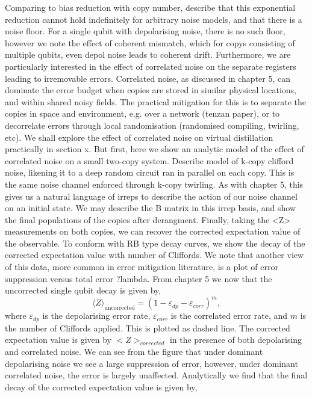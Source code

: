 Comparing to bias reduction with copy number, describe that this exponential reduction cannot hold indefinitely for arbitrary noise models, and that there is a noise floor. For a single qubit with depolarising noise, there is no such floor, however we note the effect of coherent mismatch, which for copys consisting of multiple qubits, even depol noise leads to coherent drift.
Furthermore, we are particularly interested in the effect of correlated noise on the separate registers leading to irremovable errors. Correlated noise, as discussed in chapter 5, can dominate the error budget when copies are stored in similar physical locations, and within shared noisy fields. The practical mitigation for this is to separate the copies in space and environment, e.g. over a network (tenzan paper), or to decorrelate errors through local randomisation (randomised compiling, twirling, etc). We shall explore the effect of correlated noise on virtual distillation practically in section x. But first, here we show an analytic model of the effect of correlated noise on a small two-copy system.
Describe model of k-copy clifford noise, likening it to a deep random circuit ran in parallel on each copy. This is the same noise channel enforced through k-copy twirling. As with chapter 5, this gives us a natural language of irreps to describe the action of our noise channel on an initial state. We may describe the B matrix in this irrep basis, and show the final populations of the copies after derangment. Finally, taking the <Z> measurements on both copies, we can recover the corrected expectation value of the observable. To conform with RB type decay curves, we show the decay of the corrected expectation value with number of Cliffords. We note that another view of this data, more common in error mitigation literature, is a plot of error suppression versus total error ?lambda. From chapter 5 we now that the uncorrected single qubit decay is given by,
\begin{equation}
    \langle Z \rangle_\mathrm{uncorrected} = (1-\varepsilon_{dp}-\varepsilon_{corr})^m,
\end{equation}
where $\varepsilon_{dp}$ is the depolarising error rate, $\varepsilon_{corr}$ is the correlated error rate, and $m$ is the number of Cliffords applied. This is plotted as dashed line.
The corrected expectation value is given by $<Z>_{corrected}$ in the presence of both depolarising and correlated noise.
We can see from the figure that under dominant depolarising noise we see a large suppression of error, however, under dominant correlated noise, the error is largely unaffected. Analytically we find that the final decay of the corrected expectation value is given by,

